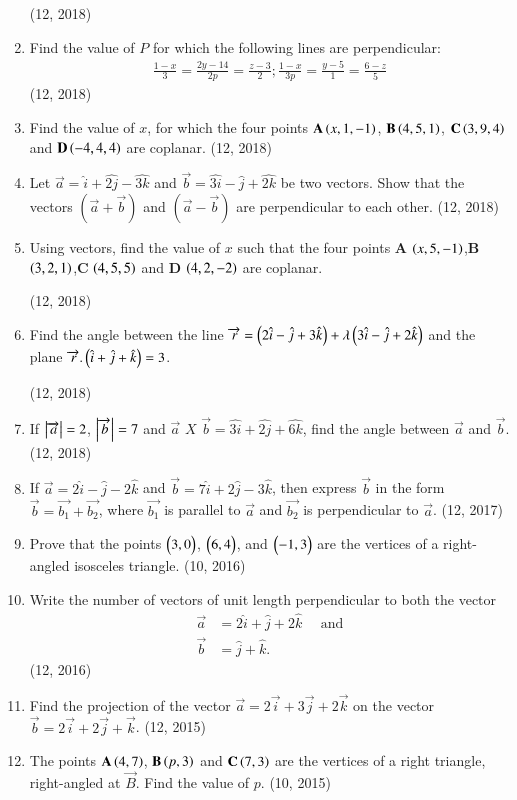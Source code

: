 \begin{enumerate}[label=\thesubsection.\arabic*, ref=\thesubsection.\theenumi]
\hfill (12, 2018)
\item Find the value of $P$ for which the following lines are perpendicular:
 \begin{align*}
 \frac{1-x}{3}=\frac{2y-14}{2p}=\frac{z-3}{2}; \frac{1-x}{3p}=\frac{y-5}{1}=\frac{6-z}{5}
 \end{align*}
 \hfill (12, 2018)
\item Find the value of $x$, for which the four points $\mathbf{A}\left(x,1,-1\right)$, $\mathbf{B}\left(4,5,1\right)$, $\mathbf{C}\left(3,9,4\right)$ and $\mathbf{D}\left(-4,4,4\right)$ are coplanar.
\hfill (12, 2018)
\item Let $\vec{a}=\hat{i}+\hat{2j}-\hat{3k}$ and $\vec{b}=\hat{3i}-\hat{j}+\hat{2k}$ be two vectors. Show that the vectors $(\vec{a}+\vec{b})$ and $(\vec{a}-\vec{b})$ are perpendicular to each other.
\hfill (12, 2018)
\item Using vectors, find the value of $x$ such that the four points $\mathbf{A}$ $\left(x,5,-1\right)$,$\mathbf{B}$ $\left(3,2,1\right)$,$\mathbf{C}$ $\left(4,5,5\right)$ and $\mathbf{D}$ $\left(4,2,-2\right)$ are coplanar.

\hfill (12, 2018) 
\item Find the angle between the line $\overrightarrow{r}=\left(2\hat{i}-\hat{j}+3\hat{k}\right)+\lambda\left(3\hat{i}-\hat{j}+2\hat{k}\right)$ and the plane $\overrightarrow{r}.\left(\hat{i}+\hat{j}+\hat{k}\right)=3$.

\hfill (12, 2018) 
\item If $\left\vert\overrightarrow{a}\right\vert=2$, $\left\vert\overrightarrow{b}\right\vert=7$ and  $\overrightarrow{a}$ $X$ $\overrightarrow{b} =\hat{3i}+\hat{2j}+\hat{6k}$, find the angle between $\overrightarrow{a}$ and $\overrightarrow{b}$.
\hfill (12, 2018) 
    \item If $\vec{a} = 2\hat{i} - \hat{j} - 2\hat{k}$ and $\vec{b} = 7\hat{i} + 2\hat{j} - 3\hat{k}$, then express $\vec{b}$ in the form $\vec{b} = \vec{b_1} + \vec{b_2}$, where $\vec{b_1}$ is parallel to $\vec{a}$ and $\vec{b_2}$ is perpendicular to $\vec{a}$. \hfill (12, 2017)
    \item Prove that the points $\begin{pmatrix}3,0\end{pmatrix}$, $\begin{pmatrix}6,4\end{pmatrix}$, and $\begin{pmatrix}-1,3\end{pmatrix}$ are the vertices of a right-angled isosceles triangle. \hfill (10, 2016)
\item Write the number of vectors of unit length perpendicular to both the vector
      \begin{align*}
          \vec{a} & = 2 \hat{i} + \hat{j} +2\hat{k} \quad\text{ and} \\
          \vec{b} & = \hat{j}+\hat{k}.
      \end{align*} \hfill (12, 2016)
\item Find the projection of the vector $\vec{a}=2\vec{i}+3\vec{j}+2\vec{k}$ on the vector $\vec{b}=2\vec{i}+2\vec{j}+\vec{k}$. \hfill (12, 2015)
\item The points $\mathbf{A}\left(4, 7\right)$, $\mathbf{B}\left(p, 3\right)$ and $\mathbf{C}\left(7, 3\right)$ are the vertices of a right triangle, right-angled at $\vec{B}$. Find the value of $p$. \hfill (10, 2015)
\end{enumerate}
